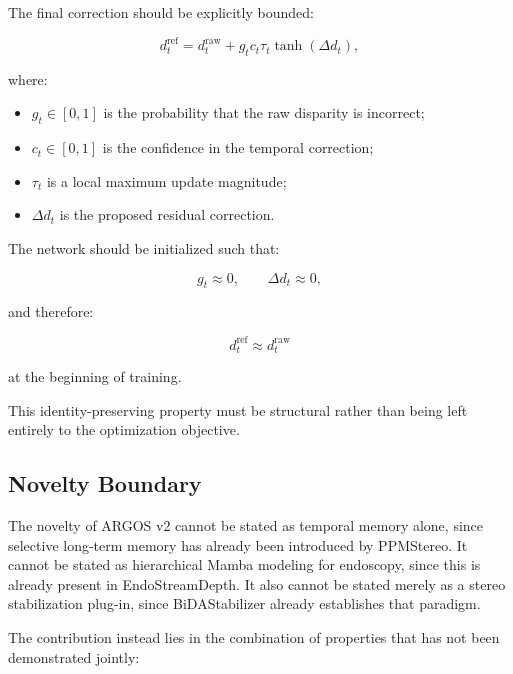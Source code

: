 \documentclass[11pt,a4paper]{article}
\begin{document}
The final correction should be explicitly bounded:

\begin{equation}
d_t^{\mathrm{ref}}
=
d_t^{\mathrm{raw}}
+
g_t
c_t
\tau_t
\tanh
\left(
\Delta d_t
\right),
\label{eq:safe_update}
\end{equation}

where:

\begin{itemize}
    \item $g_t \in [0,1]$ is the probability that the raw disparity is incorrect;
    \item $c_t \in [0,1]$ is the confidence in the temporal correction;
    \item $\tau_t$ is a local maximum update magnitude;
    \item $\Delta d_t$ is the proposed residual correction.
\end{itemize}

The network should be initialized such that:

\begin{equation}
g_t \approx 0,
\qquad
\Delta d_t \approx 0,
\end{equation}

and therefore:

\begin{equation}
d_t^{\mathrm{ref}}
\approx
d_t^{\mathrm{raw}}
\end{equation}

at the beginning of training.

This identity-preserving property must be structural rather than being left entirely to the optimization objective.

\subsection{Novelty Boundary}

The novelty of ARGOS v2 cannot be stated as temporal memory alone, since selective long-term memory has already been introduced by PPMStereo. It cannot be stated as hierarchical Mamba modeling for endoscopy, since this is already present in EndoStreamDepth. It also cannot be stated merely as a stereo stabilization plug-in, since BiDAStabilizer already establishes that paradigm.

The contribution instead lies in the combination of properties that has not been demonstrated jointly:
\end{document}
